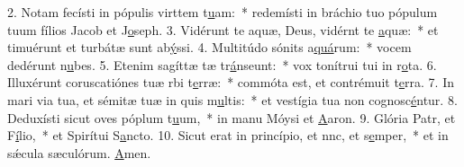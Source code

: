 2. Notam fecísti in pópulis virttem t\uline{u}am:~* redemísti in bráchio tuo pópulum tuum fílios Jacob et J\uline{o}seph.
3. Vidérunt te aquæ, Deus, vidérnt te \uline{a}quæ:~* et timuérunt et turbátæ sunt ab\uline{ý}ssi.
4. Multitúdo sónits a\uline{quá}rum:~* vocem dedérunt n\uline{u}bes.
5. Etenim sagíttæ tæ tr\uline{á}nseunt:~* vox tonítrui tui in r\uline{o}ta.
6. Illuxérunt coruscatiónes tuæ rbi t\uline{e}rræ:~* commóta est, et contrémuit t\uline{e}rra.
7. In mari via tua, et sémitæ tuæ in quis m\uline{u}ltis:~* et vestígia tua non cognosc\uline{é}ntur.
8. Deduxísti sicut oves póplum t\uline{u}um,~* in manu Móysi et \uline{A}aron.
9. Glória Patr, et F\uline{í}lio,~* et Spirítui S\uline{a}ncto.
10. Sicut erat in princípio, et nnc, et s\uline{e}mper,~* et in sǽcula sæculórum. \uline{A}men.
